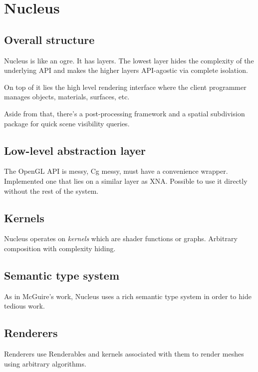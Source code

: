 
\chapter{ Nucleus }
\label{Chapter4}

\section{Overall structure}

Nucleus is like an ogre. It has layers. The lowest layer hides the complexity of the underlying API and makes the higher layers API-agostic via complete isolation.

On top of it lies the high level rendering interface where the client programmer manages objects, materials, surfaces, etc.

Aside from that, there's a post-processing framework and a spatial subdivision package for quick scene visibility queries.

\section{Low-level abstraction layer}

The OpenGL API is messy, Cg messy, must have a convenience wrapper. Implemented one that lies on a similar layer as XNA. Possible to use it directly without the rest of the system.

\section{Kernels}

Nucleus operates on \emph{kernels} which are shader functions or graphs. Arbitrary composition with complexity hiding.

\section{Semantic type system}

As in McGuire's work, Nucleus uses a rich semantic type system in order to hide tedious work.

\section{Renderers}

Renderers use Renderables and kernels associated with them to render meshes using arbitrary algorithms.

